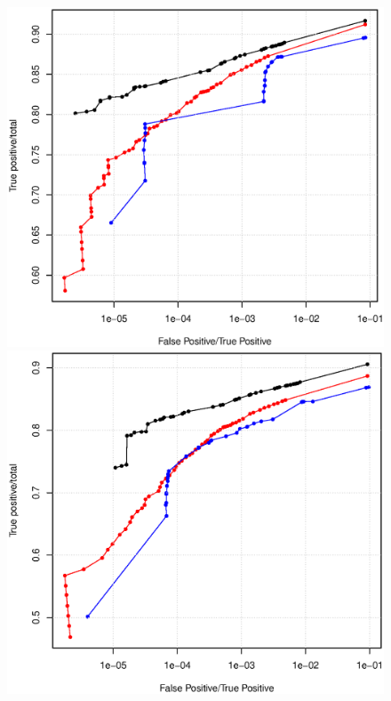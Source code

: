 \begin{figure}[h]
	\begin{minipage}[b]{0.5\linewidth}
	  \centering
	  \includegraphics[width=\textwidth]{figures/chap4_hg_1_15}
   \end{minipage}
	\begin{minipage}[b]{0.5\linewidth}
	  \centering
	  \includegraphics[width=\textwidth]{figures/chap4_hg_2_15}

\end{minipage}
\end{figure}
